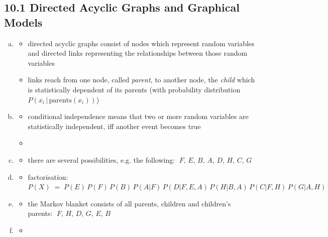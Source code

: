 \documentclass[10pt,a4paper]{article}
\begin{document}
\pagestyle{fancy}

\subsection*{10.1 Directed Acyclic Graphs and Graphical Models}
\begin{enumerate}[a)]
	\item

		\begin{itemize}
			\item directed acyclic graphs consist of nodes which represent random variables and directed links representing the relationships between those random variables
			\item links reach from one node, called \textit{parent}, to another node, the \textit{child} which is statistically dependent of its parents (with probability distribution $P(x_i\,|\,\mbox{parents}(x_i))$)
		\end{itemize}

 \item

 		\begin{itemize}
	 		\item conditional independence means that two or more random variables are statistically independent, iff another event becomes true
			\item
 		\end{itemize}

 \item

 		\begin{itemize}
			\item there are several possibilities, e.g. the following: $\;F,\,E,\,B,\,A,\,D,\,H,\,C,\,G$
		\end{itemize}

 \item

	  \begin{itemize}
	 		\item factorisation: $P(X) \;=\; P(E)\,P(F)\,P(B)\,P(A|F)\,P(D|F,E,A)\,P(H|B,A)\,P(C|F,H)\,P(G|A,H)$
	 	\end{itemize}

 \item

    \begin{itemize}
		 	\item the Markov blanket consists of all parents, children and children's parents: $\;F,\,H,\,D,\,G,\,E,\,B$
		\end{itemize}

 \item

	  \begin{itemize}
	 		\item
	 	\end{itemize}

\end{enumerate}
\end{document}
